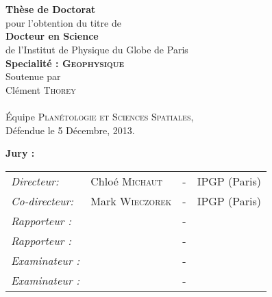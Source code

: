 \begin{titlepage}
\begin{center}
 \\
\vspace*{0.3cm}
 \\
\vspace*{0.5cm}
\noindent \Huge \textbf{Thèse de Doctorat} \\
\vspace*{0.3cm}
\noindent \large {pour l'obtention du titre de} \\
\vspace*{0.3cm}
\noindent \LARGE \textbf{Docteur en Science} \\
\vspace*{0.3cm}
\noindent \Large de l'Institut de Physique du Globe de Paris \\
\noindent \Large \textbf{Specialité : \textsc{Geophysique}}\\
\vspace*{0.4cm}
\noindent \large {Soutenue par\\}
\noindent \LARGE Cl\'ement \textsc{Thorey} \\
\vspace*{0.8cm}
 \\
\vspace*{0.8cm}
\noindent \Large \'Equipe \textsc{Plan\'etologie et Sciences Spatiales},\\
\vspace*{0.2cm}
\noindent \large Défendue le 5 Décembre, 2013. \\
\vspace*{0.5cm}
\end{center}
\noindent \large \textbf{Jury :} \\
\begin{center}
\noindent \large 
\begin{tabular}{llcl}
      \textit{Directeur:}  &  Chlo\'e  \textsc{Michaut}  &  -  &  IPGP
                                                           (Paris) \\
      \textit{Co-directeur:}  & Mark  \textsc{Wieczorek}  &  - &  IPGP
                                                             (Paris) \\
      \textit{Rapporteur :}		& 				& - & \\
			\textit{Rapporteur :}		& 	& - & \\
      \textit{Examinateur :}	& 			& - & \\
      \textit{Examinateur :}	& 			& - & 
\end{tabular} 


\end{center}
\end{titlepage}

